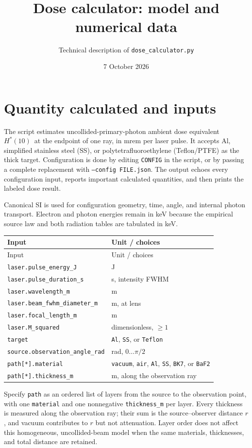 \documentclass[10pt,a4paper]{article}
\title{Dose calculator: model and numerical data}
\author{Technical description of \texttt{dose\_calculator.py}}
\date{7 October 2026}
\newcommand{\hstar}{\ensuremath{H^*(10)}}
\begin{document}
\maketitle

\section{Quantity calculated and inputs}
The script estimates uncollided-primary-photon ambient dose equivalent \hstar\ at the endpoint of one ray, in mrem per laser pulse. It accepts Al, simplified stainless steel (SS), or polytetrafluoroethylene (Teflon/PTFE) as the thick target. Configuration is done by editing \texttt{CONFIG} in the script, or by passing a complete replacement with \texttt{--config FILE.json}. The output echoes every configuration input, reports important calculated quantities, and then prints the labeled dose result.

Canonical SI is used for configuration geometry, time, angle, and internal photon transport. Electron and photon energies remain in keV because the empirical source law and both radiation tables are tabulated in keV.

\begin{longtable}{ll}
\toprule
Input & Unit / choices\\\midrule
\endfirsthead
\toprule Input & Unit / choices\\\midrule\endhead
\bottomrule\endfoot
\texttt{laser.pulse\_energy\_J} & J\\
\texttt{laser.pulse\_duration\_s} & s, intensity FWHM\\
\texttt{laser.wavelength\_m} & m\\
\texttt{laser.beam\_fwhm\_diameter\_m} & m, at lens\\
\texttt{laser.focal\_length\_m} & m\\
\texttt{laser.M\_squared} & dimensionless, $\geq1$\\
\texttt{target} & \texttt{Al}, \texttt{SS}, or \texttt{Teflon}\\
\texttt{source.observation\_angle\_rad} & rad, $0\ldots\pi/2$\\
\texttt{path[*].material} & \texttt{vacuum}, \texttt{air}, \texttt{Al}, \texttt{SS}, \texttt{BK7}, or \texttt{BaF2}\\
\texttt{path[*].thickness\_m} & m, along the observation ray\\
\end{longtable}
Specify \texttt{path} as an ordered list of layers from the source to the observation point, with one \texttt{material} and one nonnegative \texttt{thickness\_m} per layer. Every thickness is measured along the observation ray; their sum is the source--observer distance $r$, and vacuum contributes to $r$ but not attenuation. Layer order does not affect this homogeneous, uncollided-beam model when the same materials, thicknesses, and total distance are retained.
\end{document}
